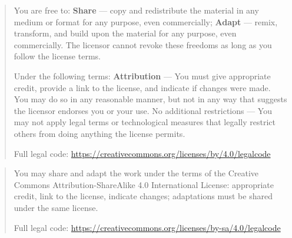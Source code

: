 \expandafter\def\csname qthesis@licensetext@CC-BY-4.0\endcsname{%
  \begin{quote}\small\raggedright
    You are free to: \textbf{Share} --- copy and redistribute the material in any medium or format for any purpose, even commercially; \textbf{Adapt} --- remix, transform, and build upon the material for any purpose, even commercially. The licensor cannot revoke these freedoms as long as you follow the license terms.

    Under the following terms: \textbf{Attribution} --- You must give appropriate credit, provide a link to the license, and indicate if changes were made. You may do so in any reasonable manner, but not in any way that suggests the licensor endorses you or your use. No additional restrictions --- You may not apply legal terms or technological measures that legally restrict others from doing anything the license permits.

    Full legal code: \url{https://creativecommons.org/licenses/by/4.0/legalcode}
  \end{quote}%
}

\expandafter\def\csname qthesis@licensetext@CC-BY-SA-4.0\endcsname{%
  \begin{quote}\small\raggedright
    You may share and adapt the work under the terms of the Creative Commons Attribution-ShareAlike 4.0 International License: appropriate credit, link to the license, indicate changes; adaptations must be shared under the same license.

    Full legal code: \url{https://creativecommons.org/licenses/by-sa/4.0/legalcode}
  \end{quote}%
}

